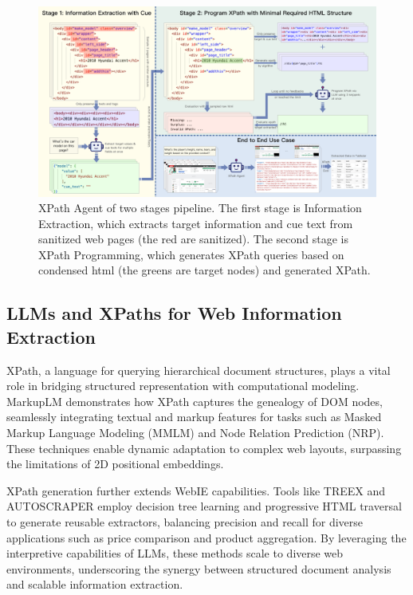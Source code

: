 \documentclass[a4paper]{article}
\begin{document}
\begin{figure}[h]
  \centering
  \includegraphics[width=1\textwidth]{./workflow.png}
  \caption{XPath Agent of two stages pipeline. The first stage is Information Extraction, which extracts target information and cue text from sanitized web pages (the red are sanitized). The second stage is XPath Programming, which generates XPath queries based on condensed html (the greens are target nodes) and generated XPath.}
  \label{fig:workflow}
  \vspace{20pt} %
\end{figure}


\subsection{LLMs and XPaths for Web Information Extraction}

XPath, a language for querying hierarchical document structures, plays a vital role in bridging structured representation with computational modeling. MarkupLM\cite{DBLP:journals/corr/abs-2110-08518} demonstrates how XPath captures the genealogy of DOM nodes, seamlessly integrating textual and markup features for tasks such as Masked Markup Language Modeling (MMLM) and Node Relation Prediction (NRP). These techniques enable dynamic adaptation to complex web layouts, surpassing the limitations of 2D positional embeddings.

XPath generation further extends WebIE capabilities. Tools like TREEX \cite{10.1145/3018661.3018740} and AUTOSCRAPER\cite{huang2024autoscraperprogressiveunderstandingweb} employ decision tree learning and progressive HTML traversal to generate reusable extractors, balancing precision and recall for diverse applications such as price comparison and product aggregation. By leveraging the interpretive capabilities of LLMs, these methods scale to diverse web environments, underscoring the synergy between structured document analysis and scalable information extraction.
\end{document}
